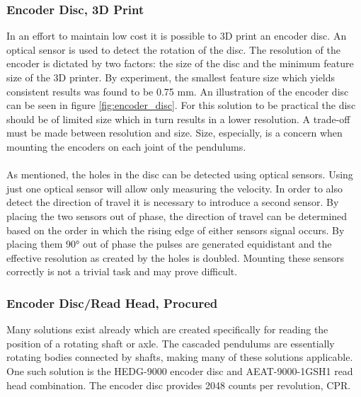 \subsubsection{Encoder Disc, 3D Print} %
\label{ssub:encoder_wheel_3d_print}
In an effort to maintain low cost it is possible to 3D print an encoder disc.
An optical sensor is used to detect the rotation of the disc.
The resolution of the encoder is dictated by two factors: the size of the disc and the minimum feature size of the 3D printer.
By experiment, the smallest feature size which yields consistent results was found to be 0.75 mm.
An illustration of the encoder disc can be seen in figure \ref{fig:encoder_disc}.
For this solution to be practical the disc should be of limited size which in turn results in a lower resolution.
A trade-off must be made between resolution and size.
Size, especially, is a concern when mounting the encoders on each joint of the pendulums.
\\~\\
As mentioned, the holes in the disc can be detected using optical sensors.
Using just one optical sensor will allow only measuring the velocity.
In order to also detect the direction of travel it is necessary to introduce a second sensor.
By placing the two sensors out of phase, the direction of travel can be determined based on the order in which the rising edge of either sensors signal occurs.
By placing them 90\si{\degree} out of phase the pulses are generated equidistant and the effective resolution as created by the holes is doubled.
Mounting these sensors correctly is not a trivial task and may prove difficult.


\subsubsection{Encoder Disc/Read Head, Procured} %
\label{ssub:encoder_disc_read_head_procured}
Many solutions exist already which are created specifically for reading the position of a rotating shaft or axle.
The cascaded pendulums are essentially rotating bodies connected by shafts, making many of these solutions applicable.
\\
One such solution is the HEDG-9000\cite{hedg9000} encoder disc and AEAT-9000-1GSH1\cite{aeat9000} read head combination.
The encoder disc provides 2048 counts per revolution, CPR.

